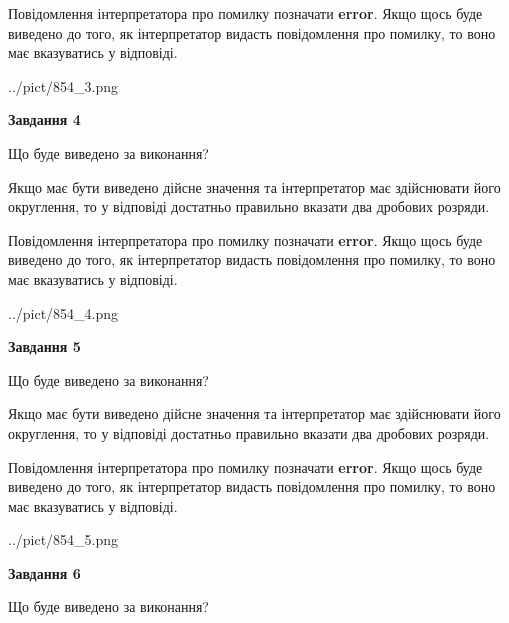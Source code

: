 \documentclass[12pt, ukrainian]{article}
\begin{document}
{\begin {Large}
Повідомлення інтерпретатора про помилку позначати \textbf{error}.
Якщо щось буде виведено до того, як інтерпретатор видасть повідомлення про помилку, 
то воно має вказуватись у відповіді. \par

\begin{center}
	{../pict/854_3.png}
\end{center}
\newpage

{\begin {center}\textbf{Завдання 4}\end {center}}\par
Що буде виведено за виконання? \par

Якщо має бути виведено дійсне значення та інтерпретатор має здійснювати його округлення, 
то у відповіді достатньо правильно вказати два дробових розряди.

Повідомлення інтерпретатора про помилку позначати \textbf{error}.
Якщо щось буде виведено до того, як інтерпретатор видасть повідомлення про помилку, 
то воно має вказуватись у відповіді. \par

\begin{center}
	{../pict/854_4.png}
\end{center}
\newpage

{\begin {center}\textbf{Завдання 5}\end {center}}\par
Що буде виведено за виконання? \par

Якщо має бути виведено дійсне значення та інтерпретатор має здійснювати його округлення, 
то у відповіді достатньо правильно вказати два дробових розряди.

Повідомлення інтерпретатора про помилку позначати \textbf{error}.
Якщо щось буде виведено до того, як інтерпретатор видасть повідомлення про помилку, 
то воно має вказуватись у відповіді. \par

\begin{center}
	{../pict/854_5.png}
\end{center}
\newpage

{\begin {center}\textbf{Завдання 6}\end {center}}\par
Що буде виведено за виконання? \par


\end{Large}}
\end{document}

